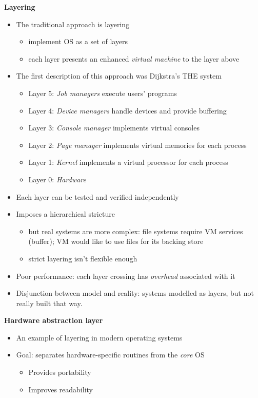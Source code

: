 \documentclass[11pt,a4paper]{article}
\begin{document}
\textbf{Layering}
\begin{itemize}
    \item The traditional approach is layering
        \begin{itemize}
            \item implement OS as a set of layers
            \item each layer presents an enhanced \emph{virtual machine} to the layer above
        \end{itemize}
    \item The first description of this approach was Dijkstra's THE system
        \begin{itemize}
            \item Layer 5: \emph{Job managers} execute users' programs
            \item Layer 4: \emph{Device managers} handle devices and provide buffering
            \item Layer 3: \emph{Console manager} implements virtual consoles
            \item Layer 2: \emph{Page manager} implements virtual memories for each process
            \item Layer 1: \emph{Kernel} implements a virtual processor for each process
            \item Layer 0: \emph{Hardware}
        \end{itemize}
    \item Each layer can be tested and verified independently
    \item Imposes a hierarchical stricture
        \begin{itemize}
            \item but real systems are more complex:
                file systems require VM services (buffer);
                VM would like to use files for its backing store
            \item strict layering isn't flexible enough
        \end{itemize}
    \item Poor performance:
        each layer crossing has \emph{overhead} associated with it
    \item Disjunction between model and reality:
        systems modelled as layers, but not really built that way.
\end{itemize}

\textbf{Hardware abstraction layer}
\begin{itemize}
    \item An example of layering in modern operating systems
    \item Goal: separates hardware-specific routines from the \emph{core} OS
        \begin{itemize}
            \item Provides portability
            \item Improves readability
        \end{itemize}
\end{itemize}
\end{document}

